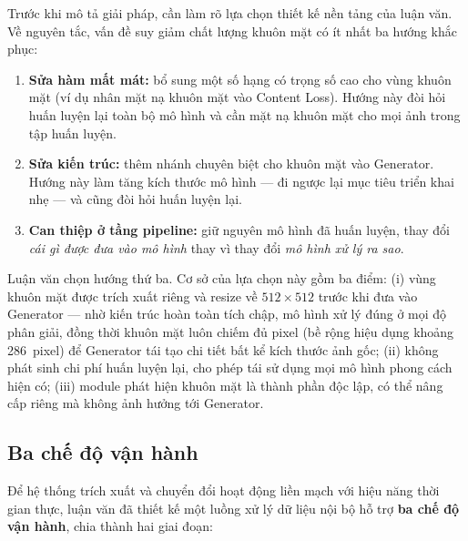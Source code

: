 Trước khi mô tả giải pháp, cần làm rõ lựa chọn thiết kế nền tảng của luận văn. Về nguyên tắc, vấn đề suy giảm chất lượng khuôn mặt có ít nhất ba hướng khắc phục:

\begin{enumerate}
    \item \textbf{Sửa hàm mất mát:} bổ sung một số hạng có trọng số cao cho vùng khuôn mặt (ví dụ nhân mặt nạ khuôn mặt vào Content Loss). Hướng này đòi hỏi huấn luyện lại toàn bộ mô hình và cần mặt nạ khuôn mặt cho mọi ảnh trong tập huấn luyện.
    \item \textbf{Sửa kiến trúc:} thêm nhánh chuyên biệt cho khuôn mặt vào Generator. Hướng này làm tăng kích thước mô hình --- đi ngược lại mục tiêu triển khai nhẹ --- và cũng đòi hỏi huấn luyện lại.
    \item \textbf{Can thiệp ở tầng pipeline:} giữ nguyên mô hình đã huấn luyện, thay đổi \textit{cái gì được đưa vào mô hình} thay vì thay đổi \textit{mô hình xử lý ra sao}.
\end{enumerate}

Luận văn chọn hướng thứ ba. Cơ sở của lựa chọn này gồm ba điểm: (i) vùng khuôn mặt được trích xuất riêng và resize về $512 \times 512$ trước khi đưa vào Generator --- nhờ kiến trúc hoàn toàn tích chập, mô hình xử lý đúng ở mọi độ phân giải, đồng thời khuôn mặt luôn chiếm đủ pixel (bề rộng hiệu dụng khoảng 286~pixel) để Generator tái tạo chi tiết bất kể kích thước ảnh gốc; (ii) không phát sinh chi phí huấn luyện lại, cho phép tái sử dụng mọi mô hình phong cách hiện có; (iii) module phát hiện khuôn mặt là thành phần độc lập, có thể nâng cấp riêng mà không ảnh hưởng tới Generator.

\subsection{Ba chế độ vận hành}
\label{subsec:three_modes}

Để hệ thống trích xuất và chuyển đổi hoạt động liền mạch với hiệu năng thời gian thực, luận văn đã thiết kế một luồng xử lý dữ liệu nội bộ hỗ trợ \textbf{ba chế độ vận hành}, chia thành hai giai đoạn:

